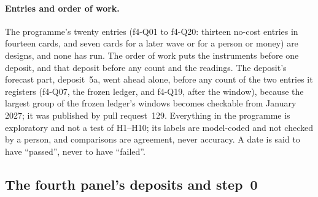 \paragraph{Entries and order of work.} The programme's twenty entries (f4-Q01 to f4-Q20: thirteen no-cost entries in
fourteen cards, and seven cards for a later wave or for a person or money) are designs, and none has run. The order of work puts the instruments before one deposit, and that deposit before any count and the readings. The deposit's forecast part,
deposit~5a, went ahead alone, before any count of the two entries it registers (f4-Q07, the frozen ledger, and
f4-Q19, after the window), because the largest group of the frozen ledger's windows becomes checkable from January 2027;
it was published by pull request~129. Everything in the programme is exploratory and not a test of H1--H10; its labels
are model-coded and not checked by a person, and comparisons are agreement, never accuracy. A date is said to have
``passed'', never to have ``failed''.

\subsection{The fourth panel's deposits and step~0}
\label{app:panel4-deposits}


